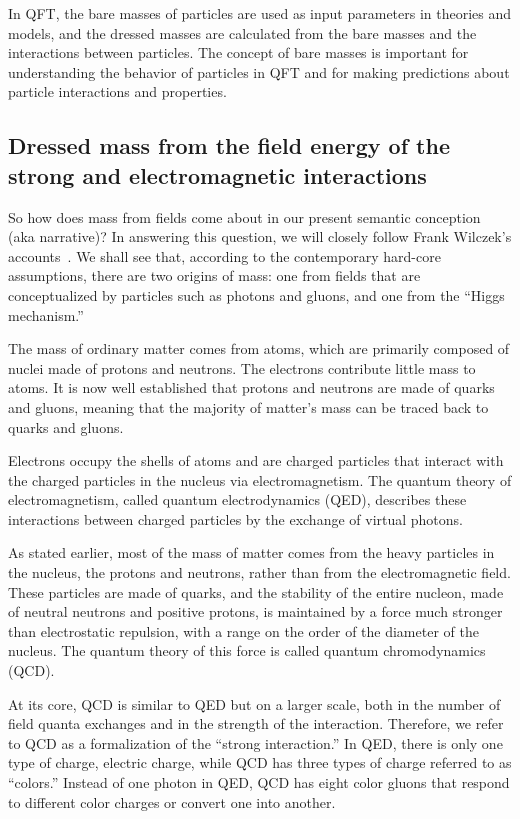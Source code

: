 In QFT, the bare masses of particles are used as input parameters in theories and models,
and the dressed masses are calculated from the bare masses and the interactions between particles.
The concept of bare masses is important for understanding the behavior of particles in QFT
and for making predictions about particle interactions and properties.

\subsection{Dressed mass from the field energy of the strong and electromagnetic interactions}

So how does mass from fields come about in our present semantic conception (aka narrative)?
In answering this question, we will closely follow Frank Wilczek's accounts~\cite{Wilczek2003,Wilczek_2012}.
We shall see that, according to the contemporary hard-core assumptions, there are two origins of mass: one from fields that are conceptualized by
particles such as photons and gluons, and one from the ``Higgs mechanism.''


The mass of ordinary matter comes from atoms, which are primarily composed of nuclei made of protons and neutrons.
The electrons contribute little mass to atoms.
It is now well established that protons and neutrons are made of quarks and gluons,
meaning that the majority of matter's mass can be traced back to quarks and gluons.

Electrons occupy the shells of atoms and are charged particles that interact with the charged particles in the nucleus via electromagnetism.
The quantum theory of electromagnetism, called quantum electrodynamics (QED),
describes these interactions between charged particles by the exchange of virtual photons.

As stated earlier, most of the mass of matter comes from the heavy particles in the nucleus,
the protons and neutrons, rather than from the electromagnetic field.
These particles are made of quarks, and the stability of the entire nucleon,
made of neutral neutrons and positive protons, is maintained by a force much stronger than electrostatic repulsion,
with a range on the order of the diameter of the nucleus.
The quantum theory of this force is called quantum chromodynamics (QCD).

At its core, QCD is similar to QED but on a larger scale, both in the number of field quanta exchanges and in the strength of the interaction.
Therefore, we refer to QCD as a formalization of the ``strong interaction.''
In QED, there is only one type of charge, electric charge, while QCD has three types of charge referred to as ``colors.''
Instead of one photon in QED, QCD has eight color gluons that respond to different color charges or convert one into another.

